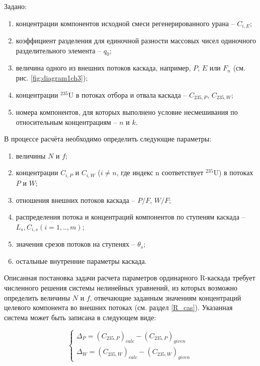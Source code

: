 Задано: 

\begin{enumerate}
  \item концентрации компонентов исходной смеси регенерированного урана -- ${C}_{i,E}$;
  \item коэффициент разделения для единочной разности массовых чисел одиночного разделительного элемента -- ${q}_{0}$;
  \item величина одного из внешних потоков каскада, например, $P$, $E$ или $F_n$ (см. рис. \ref{fig:diagram1ch3});
  \item концентрации $^{235}$U в потоках отбора и отвала каскада -- ${C_{235, P}}$, ${C_{235, W}}$;
  \item номера компонентов, для которых выполнено условие несмешивания по относительным концентрациям -- $n$ и $k$.
\end{enumerate}

В процессе расчёта необходимо определить следующие параметры: 

\begin{enumerate}
  \item величины $N$ и $f$;
  \item концентрации ${C}_{i,P}$ и ${C}_{i,W}$ ($i \neq n$, где индекс n соответствует $^{235}$U) в потоках $P$ и $W$; 
  \item отношения внешних потоков каскада -- $P/F$, $W/F$;
  \item распределения потока и концентраций компонентов по ступеням каскада -- $L_{s}, C_{i,s} (i = 1,.., m)$;
  \item значения срезов потоков на ступенях -- $\theta_{s}$;
  \item остальные внутренние параметры каскада. 
\end{enumerate}

Описанная постановка задачи расчета параметров ординарного R-каскада требует численного решения системы нелинейных уравнений, из которых возможно определить величины $N$ и $f$, отвечающие заданным значениям концентраций целевого компонента во внешних потоках (см. раздел \ref{R_cas}). Указанная система может быть записана в следующем виде: 

\begin{equation}\label{dpdw}
  \begin{cases}
  \Delta_{P} = {(C_{235, P})}_{calc}-{(C_{235, P})}_{given}\\
  \Delta_{W} = {(C_{235, W})}_{calc}-{(C_{235, W})}_{given}
  \end{cases}\,
\end{equation}

